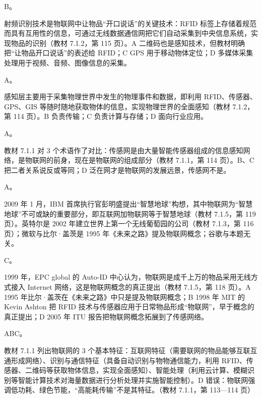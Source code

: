 \documentclass[a4paper,11pt]{article}
\begin{document}
\q B。\begin{analysis}射频识别技术是物联网中让物品“开口说话”的关键技术：RFID 标签上存储着规范而具有互用性的信息，可通过无线数据通信网把它们自动采集到中央信息系统，实现物品的识别（教材 7.1.2，第 115 页）。A 二维码也是感知技术，但教材明确把“让物品开口说话”的表述给 RFID；C GPS 用于移动物体定位；D 多媒体采集处理用于视频、音频、图像信息的采集。\end{analysis}

\q A。\begin{analysis}感知层主要用于采集物理世界中发生的物理事件和数据，即利用 RFID、传感器、GPS、GIS 等随时随地获取物体的信息，实现物理世界的全面感知（教材 7.1.2，第 114 页）。B 负责传输；C 负责计算与存储；D 面向行业应用。\end{analysis}

\q A。\begin{analysis}教材 7.1.1 对 3 个术语作了对比：传感网是由大量智能传感器组成的信息感知网络，是物联网的前身，现在是物联网的组成部分（教材 7.1.1，第 114 页）。B、C 把二者关系说反或等同；D 泛在网才是物联网的发展远景，传感网不是。\end{analysis}

\q A。\begin{analysis}2009 年 1 月，IBM 首席执行官彭明盛提出“智慧地球”构想，其中物联网为“智慧地球”不可或缺的重要部分，即互联网加物联网等于智慧地球（教材 7.1.5，第 119 页）。英特尔是 2002 年建立世界上第一个无线葡萄园的公司（教材 7.1.3，第 116 页）；微软与比尔·盖茨是 1995 年《未来之路》提及物联网概念；谷歌与本题无关。\end{analysis}

\q C。\begin{analysis}1999 年，EPC global 的 Auto-ID 中心认为，物联网是成千上万的物品采用无线方式接入 Internet 网络，这是物联网概念的真正提出（教材 7.1.5，第 118 页）。A 1995 年比尔·盖茨在《未来之路》中只是提及物联网概念；B 1998 年 MIT 的 Kevin Ashton 把 RFID 技术与传感器应用于日常物品形成“物联网”，早于概念的真正提出；D 2005 年 ITU 报告把物联网概念拓展到了传感网络。\end{analysis}


\q ABC。\begin{analysis}教材 7.1.1 列出物联网的 3 个基本特征：互联网特征（需要联网的物品能够互联互通形成网络）、识别与通信特征（具备自动识别与物物通信能力，利用 RFID、传感器、二维码等获取物体信息，实现全面感知）、智能处理（利用云计算、模糊识别等智能计算技术对海量数据进行分析处理并实施智能控制）。D 错误：物联网强调低功耗、绿色节能，“高能耗传输”不是其特征。（教材 7.1.1，第 113—114 页）\end{analysis}
\end{document}
